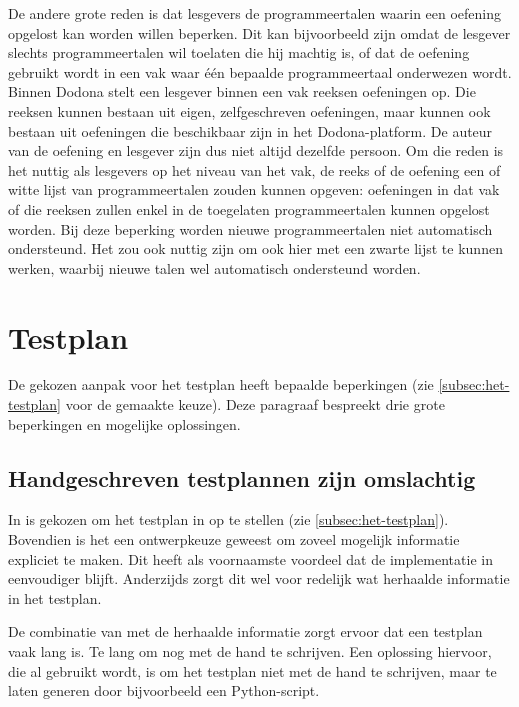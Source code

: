 De andere grote reden is dat lesgevers de programmeertalen waarin een oefening opgelost kan worden willen beperken.
Dit kan bijvoorbeeld zijn omdat de lesgever slechts programmeertalen wil toelaten die hij machtig is, of dat de oefening gebruikt wordt in een vak waar één bepaalde programmeertaal onderwezen wordt.
Binnen Dodona stelt een lesgever binnen een vak reeksen oefeningen op.
Die reeksen kunnen bestaan uit eigen, zelfgeschreven oefeningen, maar kunnen ook bestaan uit oefeningen die beschikbaar zijn in het Dodona-platform.
De auteur van de oefening en lesgever zijn dus niet altijd dezelfde persoon.
Om die reden is het nuttig als lesgevers op het niveau van het vak, de reeks of de oefening een  of witte lijst van programmeertalen zouden kunnen opgeven: oefeningen in dat vak of die reeksen zullen enkel in de toegelaten programmeertalen kunnen opgelost worden.
Bij deze beperking worden nieuwe programmeertalen niet automatisch ondersteund.
Het zou ook nuttig zijn om ook hier met een zwarte lijst te kunnen werken, waarbij nieuwe talen wel automatisch ondersteund worden.

\section{Testplan}\label{sec:beperkingen-testplan}

De gekozen aanpak voor het testplan heeft bepaalde beperkingen (zie \cref{subsec:het-testplan} voor de gemaakte keuze).
Deze paragraaf bespreekt drie grote beperkingen en mogelijke oplossingen.

\subsection{Handgeschreven testplannen zijn omslachtig}\label{subsec:handgeschreven-testplannen-zijn-omslachtig}

In \tested{} is gekozen om het testplan in  op te stellen (zie \cref{subsec:het-testplan}).
Bovendien is het een ontwerpkeuze geweest om zoveel mogelijk informatie expliciet te maken.
Dit heeft als voornaamste voordeel dat de implementatie in \tested{} eenvoudiger blijft.
Anderzijds zorgt dit wel voor redelijk wat herhaalde informatie in het testplan.

De combinatie van  met de herhaalde informatie zorgt ervoor dat een testplan vaak lang is.
Te lang om nog met de hand te schrijven.
Een oplossing hiervoor, die al gebruikt wordt, is om het testplan niet met de hand te schrijven, maar te laten generen door bijvoorbeeld een Python-script.

